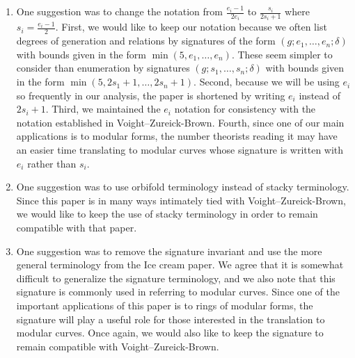 \documentclass[10 pt]{amsart}
\theoremstyle{plain}
\theoremstyle{definition}
\theoremstyle{remark}
\numberwithin{equation}{section}
\begin{document}
\begin{enumerate}
	\item One suggestion was to change the notation from $\frac{e_i - 1}{2 e_i}$
		to $\frac{s_i}{2 s_i + 1}$ where $s_i = \frac{e_i - 1}{2}$.
		First, we would like to keep our notation because we often
	list degrees of generation and relations by signatures
	of the form $(g; e_1, \ldots, e_n; \delta)$ with bounds given in
	the form $\min(5, e_1, \ldots, e_n)$. These
	seem simpler to
	consider than enumeration by signatures $(g; s_1, \ldots, s_n;
	\delta)$ with bounds given in the form $\min(5, 2s_1 + 1, \ldots,
	2s_n + 1)$. Second, because we will be using $e_i$
	so frequently in our analysis, the paper is shortened
	by writing $e_i$ instead of $2s_i+1$.
	Third, we maintained the $e_i$ notation for consistency
	with the notation established in Voight--Zureick-Brown.
	Fourth, since one of our main applications is to modular forms,
	the number theorists reading it may have an easier time translating
	to modular curves whose signature is written with $e_i$ rather than $s_i$.
	\item One suggestion was to use orbifold terminology instead
		of stacky terminology. Since this paper is in many
		ways intimately tied with Voight--Zureick-Brown,
		we would like to keep the use of stacky terminology
		in order to remain compatible with that paper.
	\item One suggestion was to remove the signature invariant
		and use the more general terminology from the
		Ice cream paper. We agree that it is
		somewhat difficult to generalize the
		signature terminology,
		and we also note that this signature is commonly used in referring
		to modular curves. Since one of the important
		applications of this paper is to rings of modular
		forms, the signature will play a useful role for
		those interested in the translation to modular curves.
		Once again, we would also like to keep the signature
		to remain compatible with Voight--Zureick-Brown.
\end{enumerate}
\end{document}
